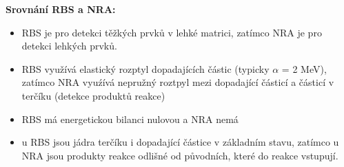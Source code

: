 \textbf{Srovnání RBS a NRA:}

\begin{itemize}
    \item RBS je pro detekci těžkých prvků v lehké matrici, zatímco NRA je pro detekci lehkých prvků.
    \item RBS využívá elastický rozptyl dopadajících částic (typicky $\alpha$ = 2 MeV), zatímco NRA vyuźívá nepružný roztpyl mezi dopadající částicí a částicí v terčíku (detekce produktů reakce)
    \item RBS má energetickou bilanci nulovou a NRA nemá
    \item u RBS jsou jádra terčíku i dopadající částice v základním stavu, zatímco u NRA jsou produkty reakce odlišné od původních, které do reakce vstupují.
\end{itemize}